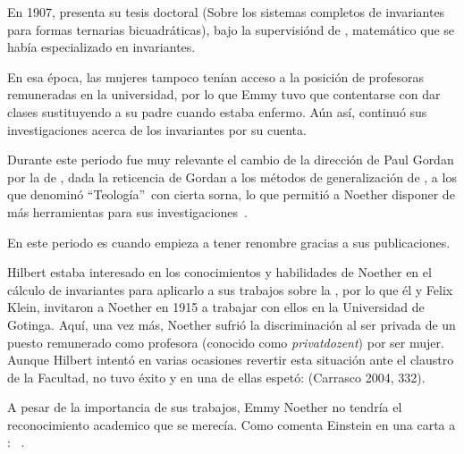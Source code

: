 En 1907, presenta su tesis doctoral  (Sobre los sistemas completos de invariantes para formas ternarias bicuadráticas), bajo la supervisiónd de , matemático que se había especializado en invariantes.

En esa época, las mujeres tampoco tenían acceso a la posición de profesoras remuneradas en la universidad, por lo que Emmy tuvo que contentarse con dar clases sustituyendo a su padre cuando estaba enfermo.
Aún así, continuó sus investigaciones acerca de los invariantes por su cuenta.

Durante este periodo fue muy relevante el cambio de la dirección de Paul Gordan por la de , dada la reticencia de Gordan a los métodos de generalización de , a los que denominó \textquotedblleft Teología\textquotedblright\ con cierta sorna, lo que permitió a Noether disponer de más herramientas para sus investigaciones~\autocite{Weyl}.

En este periodo es cuando empieza a tener renombre gracias a sus publicaciones.

Hilbert estaba interesado en los conocimientos y habilidades de Noether en el cálculo de invariantes para aplicarlo a sus trabajos sobre la ,
por lo que él y Felix Klein, invitaron a Noether en 1915 a trabajar con ellos en la Universidad de Gotinga.
Aquí, una vez más, Noether sufrió la discriminación al ser privada de un puesto remunerado como profesora (conocido como \textit{privatdozent}) por ser mujer.
Aunque Hilbert intentó en varias ocasiones revertir esta situación ante el claustro de la Facultad, no tuvo éxito y en una de ellas espetó:  (Carrasco 2004, 332).

A pesar de la importancia de sus trabajos, Emmy Noether no tendría el reconocimiento academico que se merecía.
Como comenta Einstein en una carta a : ~\autocite{Kimberling}.

